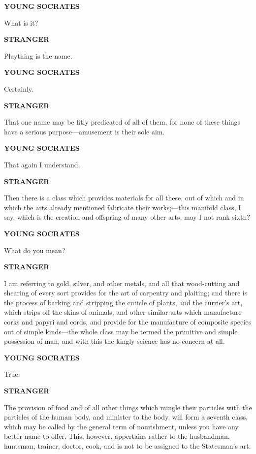 \documentclass[11pt,letter]{article}
\begin{document}
\par \textbf{YOUNG SOCRATES}
\par   What is it?

\par \textbf{STRANGER}
\par   Plaything is the name.

\par \textbf{YOUNG SOCRATES}
\par   Certainly.

\par \textbf{STRANGER}
\par   That one name may be fitly predicated of all of them, for none of these things have a serious purpose—amusement is their sole aim.

\par \textbf{YOUNG SOCRATES}
\par   That again I understand.

\par \textbf{STRANGER}
\par   Then there is a class which provides materials for all these, out of which and in which the arts already mentioned fabricate their works;—this manifold class, I say, which is the creation and offspring of many other arts, may I not rank sixth?

\par \textbf{YOUNG SOCRATES}
\par   What do you mean?

\par \textbf{STRANGER}
\par   I am referring to gold, silver, and other metals, and all that wood-cutting and shearing of every sort provides for the art of carpentry and plaiting; and there is the process of barking and stripping the cuticle of plants, and the currier's art, which strips off the skins of animals, and other similar arts which manufacture corks and papyri and cords, and provide for the manufacture of composite species out of simple kinds—the whole class may be termed the primitive and simple possession of man, and with this the kingly science has no concern at all.

\par \textbf{YOUNG SOCRATES}
\par   True.

\par \textbf{STRANGER}
\par   The provision of food and of all other things which mingle their particles with the particles of the human body, and minister to the body, will form a seventh class, which may be called by the general term of nourishment, unless you have any better name to offer. This, however, appertains rather to the husbandman, huntsman, trainer, doctor, cook, and is not to be assigned to the Statesman's art.
\end{document}
